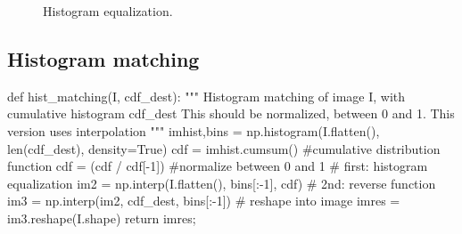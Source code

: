 \vspace*{-0.5cm}

\begin{figure}[H]
 \centering\caption{Histogram equalization.}%
 \hfill
 
 \hfill
 
  \vspace*{-7pt}
 
 \vspace*{-10pt}%
 \label{fig:enhancement:python:histeq}%
\end{figure}

\subsection{Histogram matching}

\begin{python}
def hist_matching(I, cdf_dest):
    """
    Histogram matching of image I, with cumulative histogram cdf_dest
    This should be normalized, between 0 and 1.
    This version uses interpolation
    """
    imhist,bins = np.histogram(I.flatten(), len(cdf_dest), density=True)
    cdf = imhist.cumsum() #cumulative distribution function
    cdf = (cdf / cdf[-1]) #normalize between 0 and 1
    # first: histogram equalization
    im2 = np.interp(I.flatten(), bins[:-1], cdf)
    # 2nd: reverse function
    im3 = np.interp(im2, cdf_dest, bins[:-1])
    # reshape into image 
    imres = im3.reshape(I.shape)
    return imres;
\end{python}

